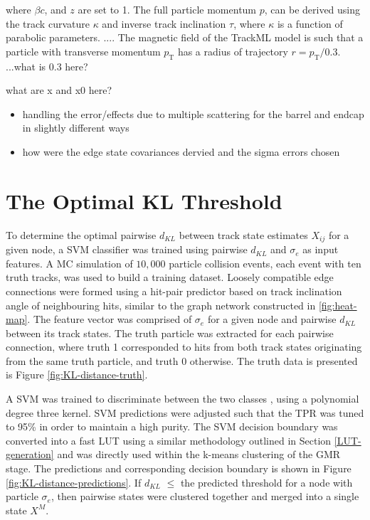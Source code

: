 where $\beta c$, and $z$ are set to 1. The full particle momentum $p$, can be derived using the track curvature $\kappa$ and inverse track inclination $\tau$, where $\kappa$ is a function of parabolic parameters. .... The magnetic field of the TrackML model is such that a particle with transverse momentum $p_\text{T}$ has a radius of trajectory $r = p_\text{T} / 0.3 $. ...what is 0.3 here?

what are x and x0 here? 


\begin{itemize}
\item handling the error/effects due to multiple scattering for the barrel and endcap in slightly different ways
\item how were the edge state covariances dervied and the sigma errors chosen
\end{itemize}





\section{The Optimal KL Threshold}
\label{chapter-6-kl-threshold}

To determine the optimal pairwise $d_{KL}$ between track state estimates $X_{ij}$ for a given node, a SVM classifier was trained using pairwise $d_{KL}$ and $\sigma_{e}$ as input features. A MC simulation of $10,000$ particle collision events, each event with ten truth tracks, was used to build a training dataset. Loosely compatible edge connections were formed using a hit-pair predictor based on track inclination angle of neighbouring hits, similar to the graph network constructed in \ref{fig:heat-map}. The feature vector was comprised of $\sigma_{e}$ for a given node and pairwise $d_{KL}$ between its track states. The truth particle was extracted for each pairwise connection, where truth 1 corresponded to hits from both track states originating from the same truth particle, and truth 0 otherwise. The truth data is presented is Figure \ref{fig:KL-distance-truth}.

A SVM was trained to discriminate between the two classes \cite{scikit-learn}, using a polynomial degree three kernel. SVM predictions were adjusted such that the TPR was tuned to 95\% in order to maintain a high purity. The SVM decision boundary was converted into a fast LUT using a similar methodology outlined in Section \ref{LUT-generation} and was directly used within the k-means clustering of the GMR stage. The predictions and corresponding decision boundary is shown in Figure \ref{fig:KL-distance-predictions}. If $d_{KL}$ $\leq$ the predicted threshold for a node with particle $\sigma_e$, then pairwise states were clustered together and merged into a single state $X^M$.

